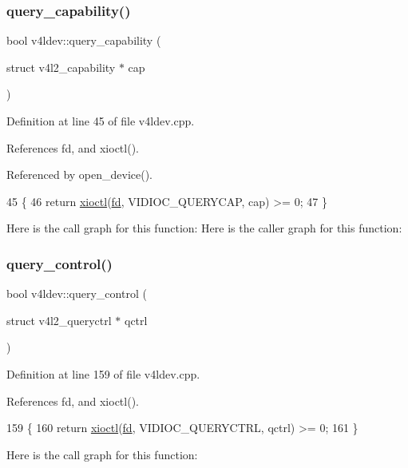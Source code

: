 \subsubsection{\texorpdfstring{query\+\_\+capability()}{query\_capability()}}
{\footnotesize\ttfamily bool v4ldev\+::query\+\_\+capability (\begin{DoxyParamCaption}\item[{struct v4l2\+\_\+capability $\ast$}]{cap }\end{DoxyParamCaption})}



Definition at line 45 of file v4ldev.\+cpp.



References fd, and xioctl().



Referenced by open\+\_\+device().


\begin{DoxyCode}
45                                                           \{
46     \textcolor{keywordflow}{return} \hyperlink{classv4ldev_ab93cb1ab18254ca362310b006bd2552d}{xioctl}(\hyperlink{classv4ldev_a2cd44be3be75a19ab8bec12b28e29142}{fd}, VIDIOC\_QUERYCAP, cap) >= 0;
47 \}
\end{DoxyCode}
Here is the call graph for this function\+:
Here is the caller graph for this function\+:
\mbox{\label{classv4ldev_a99fbec860c69f6132154871816aff128}} 
\subsubsection{\texorpdfstring{query\+\_\+control()}{query\_control()}}
{\footnotesize\ttfamily bool v4ldev\+::query\+\_\+control (\begin{DoxyParamCaption}\item[{struct v4l2\+\_\+queryctrl $\ast$}]{qctrl }\end{DoxyParamCaption})}



Definition at line 159 of file v4ldev.\+cpp.



References fd, and xioctl().


\begin{DoxyCode}
159                                                         \{
160     \textcolor{keywordflow}{return} \hyperlink{classv4ldev_ab93cb1ab18254ca362310b006bd2552d}{xioctl}(\hyperlink{classv4ldev_a2cd44be3be75a19ab8bec12b28e29142}{fd}, VIDIOC\_QUERYCTRL, qctrl) >= 0;
161 \}
\end{DoxyCode}
Here is the call graph for this function\+:
\mbox{\label{classv4ldev_a95b39e9759d93a2c55dd031ed2ef93c1}} 
